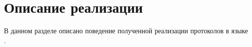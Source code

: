 \section{Описание реализации}
В данном разделе описано поведение полученной реализации протоколов в языке .



